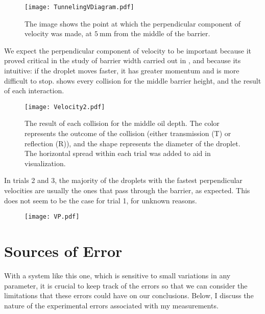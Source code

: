 \begin{figure}[h!]
	\centering
	\texttt{[image: TunnelingVDiagram.pdf]}
	\caption{The image shows the point at which the perpendicular component of velocity was made, at $5~\mathrm{mm}$ from the middle of the barrier.}
	\label{tvd}
\end{figure}

We expect the perpendicular component of velocity to be important because it proved critical in the study of barrier width carried out in , and because its intuitive: if the droplet moves faster, it has greater momentum and is more difficult to stop.  shows every collision for the middle barrier height, and the result of each interaction. 

\begin{figure}[h!]
	\centering
	\texttt{[image: Velocity2.pdf]}
	\caption{The result of each collision for the middle oil depth. The color represents the outcome of the collision (either transmission (T) or reflection (R)), and the shape represents the diameter of the droplet. The horizontal spread within each trial was added to aid in visualization.}
	\label{vel}
\end{figure}

In trials 2 and 3, the majority of the droplets with the fastest perpendicular velocities are usually the ones that pass through the barrier, as expected. This does not seem to be the case for trial 1, for unknown reasons. 


\begin{figure}[h!]
	\centering
	\texttt{[image: VP.pdf]}
	\caption{}
	\label{vp}
\end{figure}


\section{Sources of Error}
\label{sect:error}

    With a system like this one, which is sensitive to small variations in any parameter, it is crucial to keep track of the errors so that we can consider the limitations that these errors could have on our conclusions. Below, I discuss the nature of the experimental errors associated with my measurements.
       
